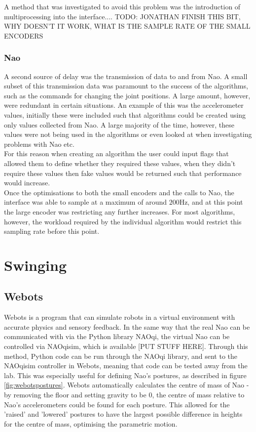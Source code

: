 \documentclass[11pt]{article}
\newcommand*\ruleline[1]{\par\noindent\raisebox{.8ex}{\makebox[\linewidth]{\hrulefill\hspace{1ex}\raisebox{-.8ex}{#1}\hspace{1ex}\hrulefill}}}
\begin{document}
A method that was investigated to avoid this problem was the introduction of multiprocessing into the interface....
TODO: JONATHAN FINISH THIS BIT, WHY DOESN'T IT WORK, WHAT IS THE SAMPLE RATE OF THE SMALL ENCODERS

\subsubsection{Nao}
\ruleline{George Sheppard}
A second source of delay was the transmission of data to and from Nao. A small subset of this transmission data was paramount to the success of the algorithms, such as the commands for changing the joint positions. A large amount, however, were redundant in certain situations. An example of this was the accelerometer values, initially these were included such that algorithms could be created using only values collected from Nao. A large majority of the time, however, these values were not being used in the algorithms or even looked at when investigating problems with Nao etc.\\

For this reason when creating an algorithm the user could input flags that allowed them to define whether they required these values, when they didn't require these values then fake values would be returned such that performance would increase.\\

Once the optimisations to both the small encoders and the calls to Nao, the interface was able to sample at a maximum of around $200$Hz, and at this point the large encoder was restricting any further increases. For most algorithms, however, the workload required by the individual algorithm would restrict this sampling rate before this point. 

\section{Swinging}

\subsection{Webots} \label{sec:webots}
\ruleline{James Doering}
Webots is a program that can simulate robots in a virtual environment with accurate physics and sensory feedback. In the same way that the real Nao can be communicated with via the Python library NAOqi, the virtual Nao can be controlled via NAOqisim, which is available [PUT STUFF HERE]. Through this method, Python code can be run through the NAOqi library, and sent to the NAOqisim controller in Webots, meaning that code can be tested away from the lab. This was especially useful for defining Nao's postures, as described in figure \ref{fig:webotspostures}. Webots automatically calculates the centre of mass of Nao - by removing the floor and setting gravity to be 0, the centre of mass relative to Nao's accelerometers could be found for each posture. This allowed for the 'raised' and 'lowered' postures to have the largest possible difference in heights for the centre of mass, optimising the parametric motion.\\
\end{document}
